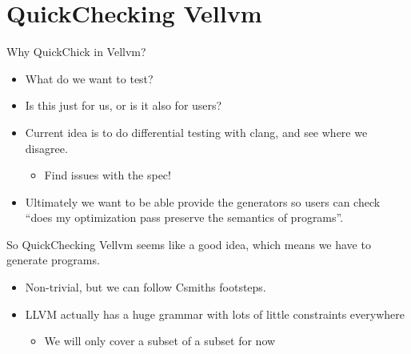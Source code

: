 \documentclass{beamer}
\begin{document}


\section{QuickChecking Vellvm}

\begin{frame}
  Why QuickChick in Vellvm?

  \begin{itemize}
  \item What do we want to test?
  \item Is this just for us, or is it also for users?
  \item Current idea is to do differential testing with clang, and see
    where we disagree.
    \begin{itemize}
    \item Find issues with the spec!
    \end{itemize}
  \item Ultimately we want to be able provide the generators so users
    can check ``does my optimization pass preserve the semantics of programs''.
  \end{itemize}
\end{frame}

\begin{frame}
  So QuickChecking Vellvm seems like a good idea, which means we have
  to generate programs.

  \begin{itemize}
  \item Non-trivial, but we can follow Csmiths footsteps.
  \item LLVM actually has a huge grammar with lots of little
    constraints everywhere
    \begin{itemize}
    \item We will only cover a subset of a subset for now
    \end{itemize}
  \end{itemize}
\end{frame}
\end{document}
